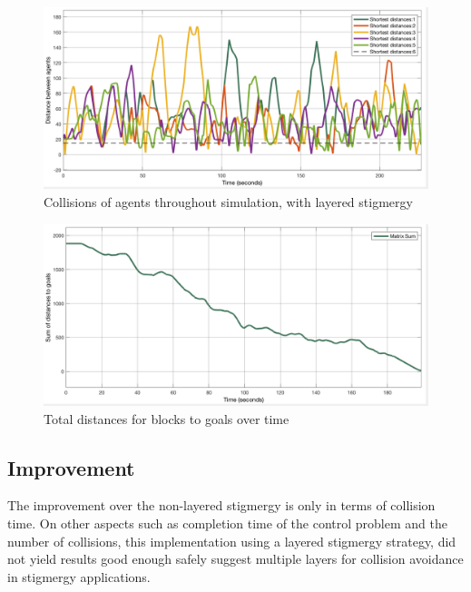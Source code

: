 \begin{figure}[H]
	\centering
	\includegraphics[width=1\columnwidth]{figures/STIG_random_agent_overlap_lay}
  	\caption{\label{fig:3d_stig_solved}Collisions of agents throughout simulation, with layered stigmergy}
\end{figure}

\begin{figure}[H]
	\centering
	\includegraphics[width=1\columnwidth]{figures/STIG_random_lay}
  	\caption{\label{fig:3d_stig_approx}Total distances for blocks to goals over time}
\end{figure}

\subsection{Improvement}
The improvement over the non-layered stigmergy is only in terms of collision time. On other aspects such as completion time of the control problem and the number of collisions, this implementation using a layered stigmergy strategy, did not yield results good enough safely suggest multiple layers for collision avoidance in stigmergy applications.